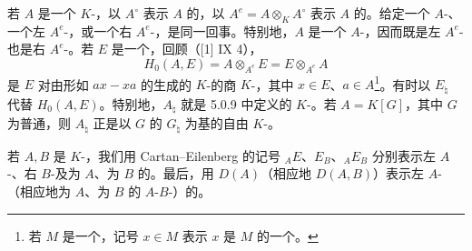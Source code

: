 若 $A$ 是一个 $K$-，以 $A^\circ$ 表示 $A$ 的，以 $A^e=A\otimes_K A^\circ$ 表示 $A$ 的。给定一个 $A$-、一个左 $A^e$-，或一个右 $A^e$-，是同一回事。特别地，$A$ 是一个 $A$-，因而既是左 $A^e$-也是右 $A^e$-。若 $E$ 是一个，回顾（[1] IX 4），
\[H_0(A,E)=A\otimes_{A^e}E=E\otimes_{A^e}A\]
是 $E$ 对由形如 $ax-xa$ 的生成的 $K$-的商 $K$-，其中 $x\in E$、$a\in A$\footnote{若 $M$ 是一个，记号 $x\in M$ 表示 $x$ 是 $M$ 的一个。}。有时以 $E_\natural$ 代替 $H_0(A,E)$。特别地，$A_\natural$ 就是 5.0.9 中定义的 $K$-。若 $A=K[G]$，其中 $G$ 为普通，则 $A_\natural$ 正是以 $G$ 的 $G_\natural$ 为基的自由 $K$-。

若 $A,B$ 是 $K$-，我们用 Cartan--Eilenberg 的记号 ${}_AE$、$E_B$、${}_AE_B$ 分别表示左 $A$-、右 $B$-及为 $A$、为 $B$ 的。最后，用 $D(A)$（相应地 $D(A,B)$）表示左 $A$-（相应地为 $A$、为 $B$ 的 $A$-$B$-）的。

